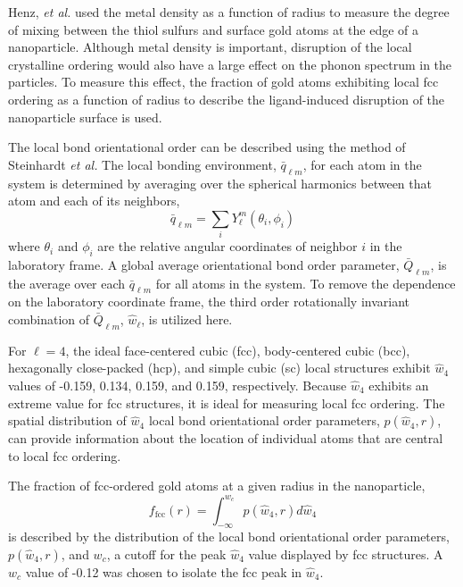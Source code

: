 Henz, \textit{et al.}\cite{Henz:2008qf} used the metal
density as a function of radius to measure the degree of mixing
between the thiol sulfurs and surface gold atoms at the edge of a
nanoparticle. Although metal density is important, disruption of the
local crystalline ordering would also have a large effect on the
phonon spectrum in the particles. To measure this effect, the
fraction of gold atoms exhibiting local fcc ordering as a function of
radius to describe the ligand-induced disruption of the nanoparticle
surface is used.

The local bond orientational order can be described using the method
of Steinhardt \textit{et al.}\cite{Steinhardt1983} The local bonding
environment, $\bar{q}_{\ell m}$, for each atom in the system is
determined by averaging over the spherical harmonics between that atom
and each of its neighbors,
\begin{equation}
\bar{q}_{\ell m} = \sum_i Y_\ell^m(\theta_i, \phi_i)
\end{equation}
where $\theta_i$ and $\phi_i$ are the relative angular coordinates of
neighbor $i$ in the laboratory frame.  A global average orientational
bond order parameter, $\bar{Q}_{\ell m}$, is the average over each
$\bar{q}_{\ell m}$ for all atoms in the system. To remove the
dependence on the laboratory coordinate frame, the third order
rotationally invariant combination of $\bar{Q}_{\ell m}$,
$\hat{w}_\ell$, is utilized here.\cite{Steinhardt1983,Vardeman:2008fk}

For $\ell=4$, the ideal face-centered cubic (fcc), body-centered cubic
(bcc), hexagonally close-packed (hcp), and simple cubic (sc) local
structures exhibit $\hat{w}_4$ values of -0.159, 0.134, 0.159, and
0.159, respectively. Because $\hat{w}_4$ exhibits an extreme value for
fcc structures, it is ideal for measuring local fcc
ordering. The spatial distribution of $\hat{w}_4$ local bond
orientational order parameters, $p(\hat{w}_4 , r)$, can provide
information about the location of individual atoms that are central to
local fcc ordering.

The fraction of fcc-ordered gold atoms at a given radius in the
nanoparticle,
\begin{equation}
	f_\mathrm{fcc}(r) = \int_{-\infty}^{w_c} p(\hat{w}_4, r) d \hat{w}_4
\end{equation}
is described by the distribution of the local bond orientational order
parameters, $p(\hat{w}_4, r)$, and $w_c$, a cutoff for the peak
$\hat{w}_4$ value displayed by fcc structures. A $w_c$ value of -0.12
was chosen to isolate the fcc peak in $\hat{w}_4$.

